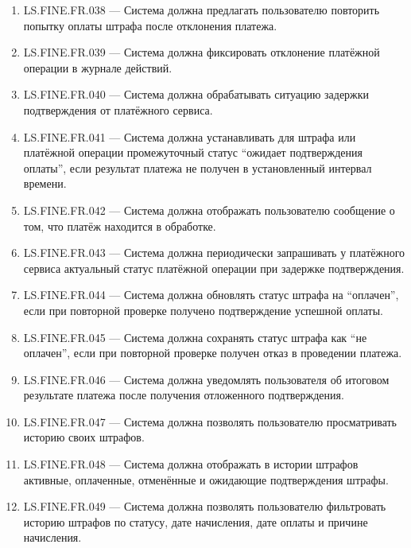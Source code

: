 \documentclass[12pt,a4paper]{article}
\begin{document}
\begin{enumerate}
		\item LS.FINE.FR.038 --- Система должна предлагать пользователю повторить попытку
		оплаты штрафа после отклонения платежа.
		
		\item LS.FINE.FR.039 --- Система должна фиксировать отклонение платёжной операции
		в журнале действий.
		
		\item LS.FINE.FR.040 --- Система должна обрабатывать ситуацию задержки подтверждения
		от платёжного сервиса.
		
		\item LS.FINE.FR.041 --- Система должна устанавливать для штрафа или платёжной
		операции промежуточный статус ``ожидает подтверждения оплаты'', если результат
		платежа не получен в установленный интервал времени.
		
		\item LS.FINE.FR.042 --- Система должна отображать пользователю сообщение о том,
		что платёж находится в обработке.
		
		\item LS.FINE.FR.043 --- Система должна периодически запрашивать у платёжного
		сервиса актуальный статус платёжной операции при задержке подтверждения.
		
		\item LS.FINE.FR.044 --- Система должна обновлять статус штрафа на ``оплачен'',
		если при повторной проверке получено подтверждение успешной оплаты.
		
		\item LS.FINE.FR.045 --- Система должна сохранять статус штрафа как ``не оплачен'',
		если при повторной проверке получен отказ в проведении платежа.
		
		\item LS.FINE.FR.046 --- Система должна уведомлять пользователя об итоговом результате
		платежа после получения отложенного подтверждения.
		
		\item LS.FINE.FR.047 --- Система должна позволять пользователю просматривать
		историю своих штрафов.
		
		\item LS.FINE.FR.048 --- Система должна отображать в истории штрафов активные,
		оплаченные, отменённые и ожидающие подтверждения штрафы.
		
		\item LS.FINE.FR.049 --- Система должна позволять пользователю фильтровать историю
		штрафов по статусу, дате начисления, дате оплаты и причине начисления.
		

\end{enumerate}
\end{document}
